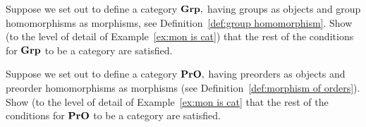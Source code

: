 \documentclass[../main/CT4S-EN-RU]{subfiles}
\begin{document}
\begin{exerciseENG}
Suppose we set out to define a category ${\mathbf{Grp}},$ having groups as objects and group homomorphisms as morphisms, see Definition~\ref{def:group homomorphism}. Show (to the level of detail of Example~\ref{ex:mon is cat}) that the rest of the conditions for ${\mathbf{Grp}}$ to be a category are satisfied.
\end{exerciseENG}

\begin{exerciseRUS}
\end{exerciseRUS}

\begin{exerciseENG}
Suppose we set out to define a category ${\mathbf{PrO}},$ having preorders as objects and preorder homomorphisms as morphisms (see Definition~\ref{def:morphism of orders}). Show (to the level of detail of Example~\ref{ex:mon is cat} that the rest of the conditions for ${\mathbf{PrO}}$ to be a category are satisfied.
\end{exerciseENG}

\begin{exerciseRUS}
\end{exerciseRUS}
\end{document}
